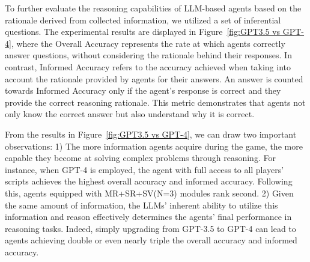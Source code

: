 \documentclass[11pt]{article}
\begin{document}

To further evaluate the reasoning capabilities of LLM-based agents based on the rationale derived from collected information, we utilized a set of inferential questions. The experimental results are displayed in Figure~\ref{fig:GPT3.5 vs GPT-4}, where the Overall Accuracy represents the rate at which agents correctly answer questions, without considering the rationale behind their responses. In contrast, Informed Accuracy refers to the accuracy achieved when taking into account the rationale provided by agents for their answers. An answer is counted towards Informed Accuracy only if the agent's response is correct and they provide the correct reasoning rationale. This metric demonstrates that agents not only know the correct answer but also understand why it is correct.

From the results in Figure~\ref{fig:GPT3.5 vs GPT-4}, we can draw two important observations: 1) The more information agents acquire during the game, the more capable they become at solving complex problems through reasoning. For instance, when GPT-4 is employed, the agent with full access to all players' scripts achieves the highest overall accuracy and informed accuracy. Following this, agents equipped with MR+SR+SV(N=3) modules rank second. 2) Given the same amount of information, the LLMs' inherent ability to utilize this information and reason effectively determines the agents' final performance in reasoning tasks. Indeed, simply upgrading from GPT-3.5 to GPT-4 can lead to agents achieving double or even nearly triple the overall accuracy and informed accuracy.
\end{document}
